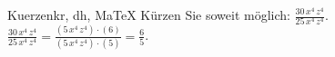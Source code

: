 \begin{MAufgabe}{Kuerzen}{kr, dh, MaTeX}
K\"urzen Sie soweit m\"oglich: $\frac{30\, x^4\, z^4}{25\, x^4\, z^4}$.\\ 
\ifLsg\MLoesung
\quad $\frac{30\, x^4\, z^4}{25\, x^4\, z^4}=\frac{(5\, x^4\, z^4)\cdot(6)}{(5\, x^4\, z^4)\cdot(5)}=\frac{6}{5}$.\else\relax\fi
 \end{MAufgabe}